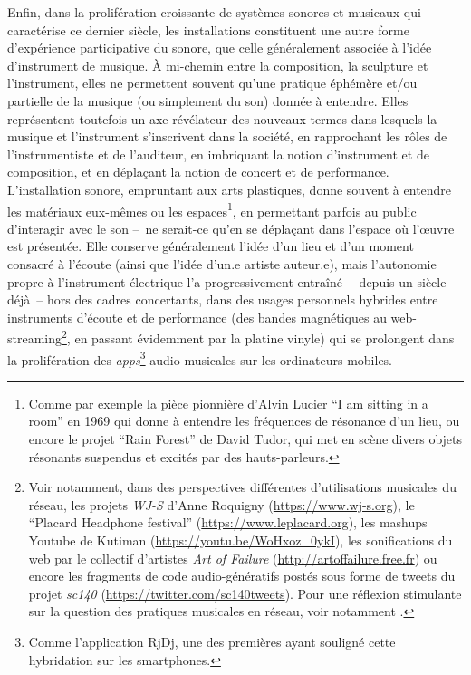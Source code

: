 \noindent Enfin, dans la prolifération croissante de systèmes sonores et musicaux qui caractérise ce dernier siècle, les installations constituent une autre forme d'expérience participative du sonore, que celle généralement associée à l'idée d'instrument de musique. À mi-chemin entre la composition, la sculpture et l'instrument, elles ne permettent souvent qu'une pratique éphémère et/ou partielle de la musique (ou simplement du son) donnée à entendre. Elles représentent toutefois un axe révélateur des nouveaux termes dans lesquels la musique et l'instrument s'inscrivent dans la société, en rapprochant les rôles de l'instrumentiste et de l'auditeur, en imbriquant la notion d'instrument et de composition, et en déplaçant la notion de concert et de performance.\\
\indent L'installation sonore, empruntant aux arts plastiques, donne souvent à entendre les matériaux eux-mêmes ou les espaces\footnote{Comme par exemple la pièce pionnière d'Alvin Lucier ``I am sitting in a room'' en 1969  qui donne à entendre les fréquences de résonance d'un lieu, ou encore le projet ``Rain Forest'' de David Tudor, qui met en scène divers objets résonants suspendus et excités par des hauts-parleurs.}, en permettant parfois au public d'interagir avec le son --~ne serait-ce qu'en se déplaçant dans l'espace où l'œuvre est présentée. Elle conserve généralement l'idée d'un lieu et d'un moment consacré à l'écoute (ainsi que l'idée d'un.e artiste auteur.e), mais l'autonomie propre à l'instrument électrique l'a progressivement entraîné --~depuis un siècle déjà~-- hors des cadres concertants, dans des usages personnels hybrides entre instruments d'écoute et de performance (des bandes magnétiques au web-streaming\footnote{Voir notamment, dans des perspectives différentes d'utilisations musicales du réseau, les projets \textit{WJ-S} d'Anne Roquigny (\url{https://www.wj-s.org}), le ``Placard Headphone festival'' (\url{https://www.leplacard.org}), les mashups Youtube de Kutiman (\url{https://youtu.be/WoHxoz_0ykI}), les sonifications du web par le collectif d'artistes \textit{Art of Failure} (\url{http://artoffailure.free.fr}) ou encore les fragments de code audio-génératifs postés sous forme de tweets du projet \textit{sc140} (\url{https://twitter.com/sc140tweets}). Pour une réflexion stimulante sur la question des pratiques musicales en réseau, voir notamment \cite{joy_epoque_2009}.}, en passant évidemment par la platine vinyle) qui se prolongent dans la prolifération des \textit{apps}\footnote{Comme l'application RjDj, une des premières ayant souligné cette hybridation sur les smartphones.} audio-musicales sur les ordinateurs mobiles.\\
